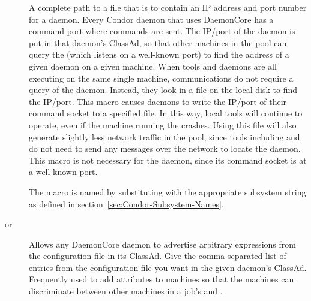 \begin{description}
\item[]
  \label{param:SubsysAddressFile}
  A complete path to a file that is to contain an
  IP address and port number for a daemon. 
  Every Condor daemon that uses
  DaemonCore has a command port where commands are sent.
  The IP/port of the daemon is put in that daemon's ClassAd,
  so that other machines in the pool can query the
   (which listens on a well-known port)
  to find the address of a given daemon on a given machine.
  When tools and daemons are all executing on the same
  single machine, communications do not require a query of the
   daemon.
  Instead, they look in a file on the local disk
  to find the IP/port.
  This macro causes daemons to write the
  IP/port of their command socket to a specified file.
  In this way,
  local tools will continue to operate,
  even if the machine running the  crashes.
  Using this file will also generate
  slightly less network traffic in the pool,
  since tools including  and
   do not need to send any messages over the network to
  locate the  daemon.
  This macro is not necessary for the  
  daemon, since its command socket is at a well-known port.  
  
  The macro is named by substituting 
  with the appropriate subsystem string as defined in
  section~\ref{sec:Condor-Subsystem-Names}.
  
\item[ or \label{param:SubsysExprs}
  ] \label{param:SubsysAttrs}
  Allows any DaemonCore daemon to advertise arbitrary
  expressions from the configuration file in its ClassAd.  Give the
  comma-separated list of entries from the configuration file you want in the
  given daemon's ClassAd.
  Frequently used to add attributes to machines so that the
  machines can discriminate between other machines in a job's 
   and .


\end{description}
